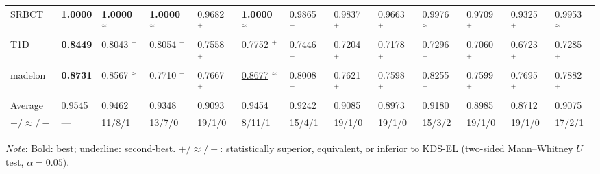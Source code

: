 \begin{table}[t]
{\begin{tabular}{l *{12}{w{c}{33pt}}}
SRBCT            & \textbf{1.0000} & \textbf{1.0000} $^{\approx}$ & \textbf{1.0000} $^{\approx}$ & 0.9682 $^{+}$ & \textbf{1.0000} $^{\approx}$ & 0.9865 $^{+}$ & 0.9837 $^{+}$ & 0.9663 $^{+}$ & 0.9976 $^{\approx}$ & 0.9709 $^{+}$ & 0.9325 $^{+}$ & 0.9953 $^{\approx}$ \\
T1D              & \textbf{0.8449} & 0.8043 $^{+}$ & \underline{0.8054} $^{+}$ & 0.7558 $^{+}$ & 0.7752 $^{+}$ & 0.7446 $^{+}$ & 0.7204 $^{+}$ & 0.7178 $^{+}$ & 0.7296 $^{+}$ & 0.7060 $^{+}$ & 0.6723 $^{+}$ & 0.7285 $^{+}$ \\
madelon          & \textbf{0.8731} & 0.8567 $^{\approx}$ & 0.7710 $^{+}$ & 0.7667 $^{+}$ & \underline{0.8677} $^{\approx}$ & 0.8008 $^{+}$ & 0.7621 $^{+}$ & 0.7598 $^{+}$ & 0.8255 $^{+}$ & 0.7599 $^{+}$ & 0.7695 $^{+}$ & 0.7882 $^{+}$ \\
\midrule
Average          & 0.9545 & 0.9462 & 0.9348 & 0.9093 & 0.9454 & 0.9242 & 0.9085 & 0.8973 & 0.9180 & 0.8985 & 0.8712 & 0.9075 \\
$+ / \approx / -$ & — & 11/8/1 & 13/7/0 & 19/1/0 & 8/11/1 & 15/4/1 & 19/1/0 & 19/1/0 & 15/3/2 & 19/1/0 & 19/1/0 & 17/2/1 \\
\bottomrule
\end{tabular}
}
\vspace{2pt}
\par\raggedright\footnotesize
\textit{Note}: Bold: best; underline: second-best. $+ / \approx / -$: statistically superior, equivalent, or inferior to KDS-EL (two-sided Mann--Whitney $U$ test, $\alpha = 0.05$).
\end{table}